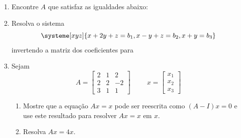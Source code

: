 \documentclass[a4paper,5pt]{amsbook}
\begin{document}
\begin{enumerate}
	\vspace{0.5cm}
	\item Encontre $A$ que satisfaz as igualdades abaixo:


	\vspace{0.5cm}
	\item Resolva o sistema
		\[\systeme[xyz]{
				x + 2y + z = b_1,
				x - y + z = b_2,
				x + y = b_3
			}\]
		invertendo a matriz dos coeficientes para


	\vspace{0.5cm}
	\item Sejam
		\[A = \begin{bmatrix}
				2 & 1 & 2 \\
				2 & 2 & -2 \\
				3 & 1 & 1
			\end{bmatrix}
		\hspace{1cm}
		x = \begin{bmatrix}
			x_1 \\ x_2 \\ x_3
			\end{bmatrix}\]
			\begin{enumerate}
				\item Mostre que a equa\c{c}\~ao $Ax=x$ pode ser reescrita como
					$(A-I)x = 0$ e use este resultado para resolver $Ax=x$ em
					$x$.
				\item Resolva $Ax=4x$.
			\end{enumerate}


\end{enumerate}
\end{document}
